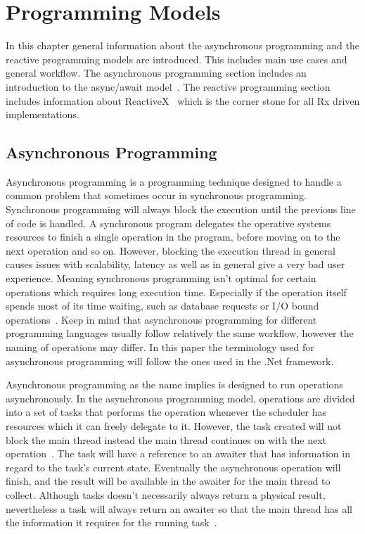 \chapter{Programming Models}
\label{chapter:ProgrammingModels}
In this chapter general information about the asynchronous programming and the reactive programming models are introduced. This includes main use cases and general workflow. The asynchronous programming section includes an introduction to the async/await model~\cite{DOC:AsyncAwait}. The reactive programming section includes information about ReactiveX~\cite{WEB:ReactiveXMainPage} which is the corner stone for all Rx driven implementations.
\section{Asynchronous Programming}
\label{section:AsyncProgramming}
Asynchronous programming is a programming technique designed to handle a common problem that sometimes occur in synchronous programming. Synchronous programming will always block the execution until the previous line of code is handled. A synchronous program delegates the operative systems resources to finish a single operation in the program, before moving on to the next operation and so on. However, blocking the execution thread in general causes issues with scalability, latency as well as in general give a very bad user experience. Meaning synchronous programming isn't optimal for certain operations which requires long execution time. Especially if the operation itself spends most of its time waiting, such as database requests or I/O bound operations~\cite{VIDEO:AsyncConBack, WEB:AsyncAwaitTut}. Keep in mind that asynchronous programming for different programming languages usually follow relatively the same workflow, however the naming of operations may differ. In this paper the terminology used for asynchronous programming will follow the ones used in the .Net framework. 

Asynchronous programming as the name implies is designed to run operations asynchronously. In the asynchronous programming model, operations are divided into a set of tasks that performs the operation whenever the scheduler has resources which it can freely delegate to it. 
However, the task created will not block the main thread instead the main thread continues on with the next operation~\cite{WEB:AsyncAwaitTut, VIDEO:AsyncConBack, DOC:AsyncAwait}.
The task will have a reference to an awaiter that has information in regard to the task's current state. Eventually the asynchronous operation will finish, and the result will be available in the awaiter for the main thread to collect. Although tasks doesn't necessarily always return a physical result, nevertheless a task will always return an awaiter so that the main thread has all the information it requires for the running task~\cite{WEB:AsyncAwaitTut}.

